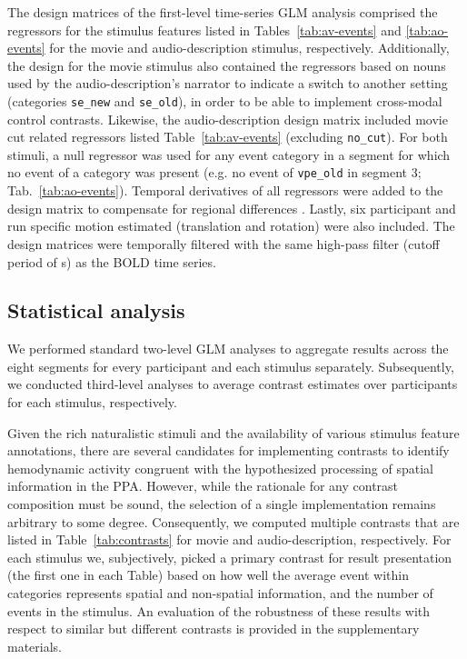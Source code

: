 \documentclass[english]{article}
\begin{document}
The design matrices of the first-level time-series GLM analysis comprised the
regressors for the stimulus features listed in Tables~\ref{tab:av-events} and
\ref{tab:ao-events} for the movie and audio-description stimulus, respectively.
Additionally, the design for the movie stimulus also contained the
regressors based on nouns used by the audio-description's narrator to indicate
a switch to another setting (categories \texttt{se\_new} and \texttt{se\_old}),
in order to be able to implement cross-modal control contrasts.
Likewise, the audio-description design matrix included movie cut related regressors
listed Table~\ref{tab:av-events} (excluding \texttt{no\_cut}).
For both stimuli, a null regressor was used for any event category in a segment
for which no event of a category was present (e.g. no event of
\texttt{vpe\_old} in segment 3; Tab.~\ref{tab:ao-events}).
Temporal derivatives of all regressors were added to the design matrix to compensate for
regional differences \citep{friston1998event}.
Lastly, six participant and run specific motion estimated (translation and rotation)
were also included.
The design matrices were temporally filtered with the same high-pass filter (cutoff period of
\unit[150]{s}) as the BOLD time series.


\subsection{Statistical analysis}

We performed standard two-level GLM analyses to aggregate results across the eight
segments for every participant and each stimulus separately.
Subsequently, we conducted third-level analyses to average contrast estimates
over participants for each stimulus, respectively.

Given the rich naturalistic stimuli and the availability of various stimulus
feature annotations, there are several candidates for implementing contrasts to
identify hemodynamic activity congruent with the hypothesized processing of
spatial information in the PPA. However, while the rationale for any contrast
composition must be sound, the selection of a single implementation remains
arbitrary to some degree. Consequently, we computed multiple contrasts that are
listed in Table~\ref{tab:contrasts} for movie
and audio-description, respectively. For each stimulus we, subjectively, picked
a primary contrast for result presentation (the first one in each Table) based
on how well the average event within categories represents spatial and
non-spatial information, and the number of events in the stimulus.
An evaluation of the robustness of these results with respect to similar but
different contrasts is provided in the supplementary materials.
\end{document}
